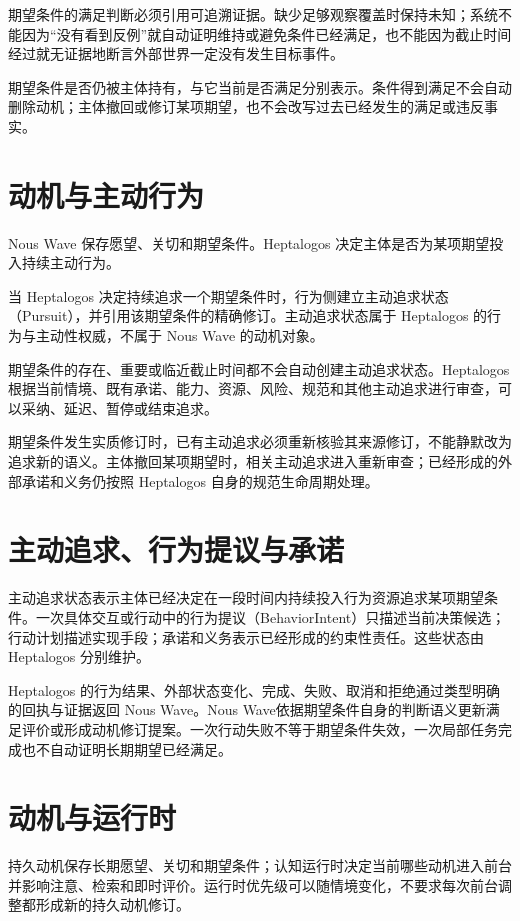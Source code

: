 期望条件的满足判断必须引用可追溯证据。缺少足够观察覆盖时保持未知；系统不能因为“没有看到反例”就自动证明维持或避免条件已经满足，也不能因为截止时间经过就无证据地断言外部世界一定没有发生目标事件。

期望条件是否仍被主体持有，与它当前是否满足分别表示。条件得到满足不会自动删除动机；主体撤回或修订某项期望，也不会改写过去已经发生的满足或违反事实。

\section{动机与主动行为}

Nous Wave 保存愿望、关切和期望条件。Heptalogos 决定主体是否为某项期望投入持续主动行为。

当 Heptalogos 决定持续追求一个期望条件时，行为侧建立主动追求状态（Pursuit），并引用该期望条件的精确修订。主动追求状态属于 Heptalogos 的行为与主动性权威，不属于 Nous Wave 的动机对象。

期望条件的存在、重要或临近截止时间都不会自动创建主动追求状态。Heptalogos 根据当前情境、既有承诺、能力、资源、风险、规范和其他主动追求进行审查，可以采纳、延迟、暂停或结束追求。

期望条件发生实质修订时，已有主动追求必须重新核验其来源修订，不能静默改为追求新的语义。主体撤回某项期望时，相关主动追求进入重新审查；已经形成的外部承诺和义务仍按照 Heptalogos 自身的规范生命周期处理。

\section{主动追求、行为提议与承诺}

主动追求状态表示主体已经决定在一段时间内持续投入行为资源追求某项期望条件。一次具体交互或行动中的行为提议（BehaviorIntent）只描述当前决策候选；行动计划描述实现手段；承诺和义务表示已经形成的约束性责任。这些状态由 Heptalogos 分别维护。

Heptalogos 的行为结果、外部状态变化、完成、失败、取消和拒绝通过类型明确的回执与证据返回 Nous Wave。Nous Wave依据期望条件自身的判断语义更新满足评价或形成动机修订提案。一次行动失败不等于期望条件失效，一次局部任务完成也不自动证明长期期望已经满足。

\section{动机与运行时}

持久动机保存长期愿望、关切和期望条件；认知运行时决定当前哪些动机进入前台并影响注意、检索和即时评价。运行时优先级可以随情境变化，不要求每次前台调整都形成新的持久动机修订。
